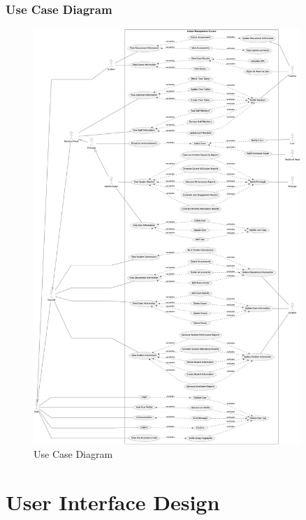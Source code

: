 \documentclass[12pt,a4paper]{report}
\begin{document}
\subsection{Use Case Diagram}
\begin{figure}[htbp]
    \centering
    \includegraphics[width=0.9\textwidth]{use-case-diagram.png}
    \caption{Use Case Diagram}
    \label{fig:use-case-diagram}
\end{figure}

\chapter{User Interface Design}
\end{document}
